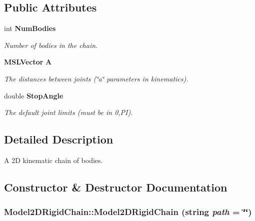 \subsection*{Public Attributes}
\begin{CompactItemize}
\item 
int {\bf Num\-Bodies}
\begin{CompactList}\small\item\em Number of bodies in the chain.\item\end{CompactList}\item 
{\bf MSLVector} {\bf A}
\begin{CompactList}\small\item\em The distances between joints (\char`\"{}a\char`\"{} parameters in kinematics).\item\end{CompactList}\item 
double {\bf Stop\-Angle}
\begin{CompactList}\small\item\em The default joint limits (must be in 0,PI).\item\end{CompactList}\end{CompactItemize}


\subsection{Detailed Description}
A 2D kinematic chain of bodies.



\subsection{Constructor \& Destructor Documentation}
\subsubsection{\setlength{\rightskip}{0pt plus 5cm}Model2DRigid\-Chain::Model2DRigid\-Chain (string {\em path} = \char`\"{}\char`\"{})}\label{classModel2DRigidChain_a0}


